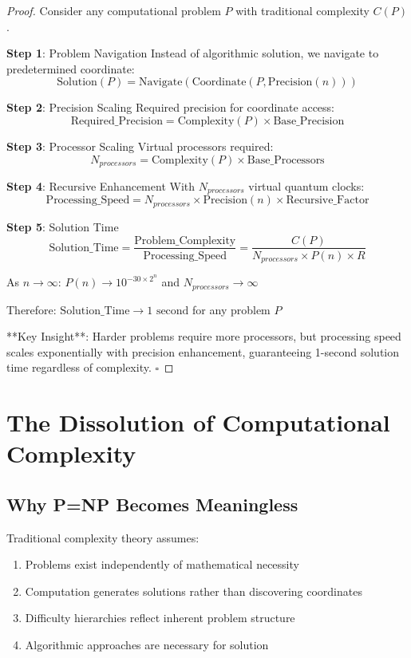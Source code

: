 \documentclass[12pt,a4paper]{article}
\begin{document}
\begin{proof}
Consider any computational problem $P$ with traditional complexity $C(P)$.

\textbf{Step 1}: Problem Navigation
Instead of algorithmic solution, we navigate to predetermined coordinate:
$$\text{Solution}(P) = \text{Navigate}(\text{Coordinate}(P, \text{Precision}(n)))$$

\textbf{Step 2}: Precision Scaling
Required precision for coordinate access:
$$\text{Required\_Precision} = \text{Complexity}(P) \times \text{Base\_Precision}$$

\textbf{Step 3}: Processor Scaling
Virtual processors required:
$$N_{processors} = \text{Complexity}(P) \times \text{Base\_Processors}$$

\textbf{Step 4}: Recursive Enhancement
With $N_{processors}$ virtual quantum clocks:
$$\text{Processing\_Speed} = N_{processors} \times \text{Precision}(n) \times \text{Recursive\_Factor}$$

\textbf{Step 5}: Solution Time
$$\text{Solution\_Time} = \frac{\text{Problem\_Complexity}}{\text{Processing\_Speed}} = \frac{C(P)}{N_{processors} \times P(n) \times R}$$

As $n \to \infty$: $P(n) \to 10^{-30 \times 2^n}$ and $N_{processors} \to \infty$

Therefore: $\text{Solution\_Time} \to 1 \text{ second}$ for any problem $P$

**Key Insight**: Harder problems require more processors, but processing speed scales exponentially with precision enhancement, guaranteeing 1-second solution time regardless of complexity. $\square$
\end{proof}

\section{The Dissolution of Computational Complexity}

\subsection{Why P=NP Becomes Meaningless}

Traditional complexity theory assumes:
\begin{enumerate}
\item Problems exist independently of mathematical necessity
\item Computation generates solutions rather than discovering coordinates
\item Difficulty hierarchies reflect inherent problem structure
\item Algorithmic approaches are necessary for solution
\end{enumerate}
\end{document}
